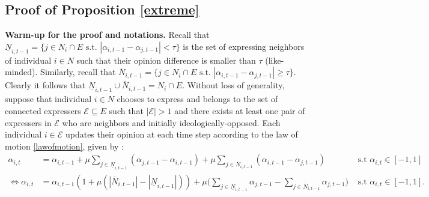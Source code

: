 \documentclass{article}
\newtheorem{claim}{Claim}
\begin{document}

\subsection{Proof of Proposition \ref{extreme}} \label{proofextreme}

{\bf Warm-up for the proof and notations.} Recall that $\underline{N}_{i,t-1} = \{ j \in N_i \cap E \text{ s.t. } |\alpha_{i,t-1} - \alpha_{j,t-1}| < \tau  \}$ is the set of expressing neighbors of individual $i \in N$ such that their opinion difference is smaller than $\tau$ (like-minded). Similarly, recall that $\overline{N}_{i,t-1} = \{ j \in N_i \cap E \text{ s.t. } |\alpha_{i,t-1} - \alpha_{j,t-1}| \geq \tau  \}$.  Clearly it follows that $\underline{N}_{i,t-1} \cup \overline{N}_{i,t-1} = N_i \cap {E} $. Without loss of generality, suppose that individual $i \in N$ chooses to express and belongs to the set of connected expressers $\mathcal{E} \subseteq E$ such that $|\mathcal{E}| > 1$ and there exists at least one pair of expressers in $\mathcal{E}$ who are neighbors and initially ideologically-opposed. Each individual $i \in \mathcal{E} $ updates their opinion at each time step according to the law of motion \eqref{lawofmotion}, given by :
\begin{align}
 \alpha_{i,t} & = \alpha_{i,t-1} + \mu   \sum_{j \in \underline{N}_{i,t-1} } (\alpha_{j,t-1} - \alpha_{i,t-1} ) +  \mu \sum_{j \in \overline{N}_{i,t-1} } (\alpha_{i,t-1} - \alpha_{j,t-1} )  & \text{ s.t  } \alpha_{i,t} \in [-1,1] \label{expression1lom}\\
\Leftrightarrow \alpha_{i,t} &  =  \alpha_{i,t-1} ( 1 + \mu ( | \overline{N}_{i,t-1} | - |\underline{N}_{i,t-1}| )) + \mu \big(  \sum_{j \in \underline{N}_{i,t-1} } \alpha_{j,t-1}  -   \sum_{j \in \overline{N}_{i,t-1} }  \alpha_{j,t-1} \big) & \text{ s.t  } \alpha_{i,t} \in [-1,1]. \label{expression2lom}
\end{align}
\end{document}
